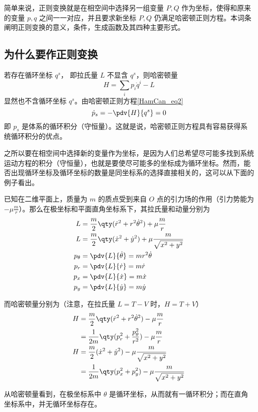 

简单来说，正则变换就是在相空间中选择另一组变量 $P,Q$ 作为坐标，使得和原来的变量 $p,q$ 之间一一对应，并且要求新坐标 $P,Q$ 仍满足哈密顿正则方程。本词条阐明正则变换的意义，条件，生成函数及其四种主要形式。
\subsection{为什么要作正则变换}
若存在循环坐标 $q^s$， 即拉氏量 $L$ 不显含 $q^s$，则哈密顿量
\begin{equation}
H=\sum_i p_i\dot q^i-L
\end{equation}
显然也不含循环坐标 $q^s$。由哈密顿正则方程\autoref{HamCan_eq2}~
\begin{equation}\label{CanTra_eq7}
\dot p_s=-\pdv{H}{q^s}=0
\end{equation}
即 $p_s$ 是体系的循环积分（守恒量）。这就是说，哈密顿正则方程具有容易获得系统循环积分的优点。

之所以要在相空间中选择新的变量作为坐标，是因为人们总希望尽可能多找到系统运动方程的积分（守恒量），也就是要使尽可能多的坐标成为循环坐标。然而，能否出现循环坐标及循环坐标的数量是同坐标系的选择直接相关的，这可以从下面的例子看出。
\begin{example}{}
已知在二维平面上，质量为 $m$ 的质点受到来自 $O$ 点的引力场的作用（引力势能为 $-\mu\frac{m}{r}$）。那么在极坐标和平面直角坐标系下，其拉氏量和动量分别为
\begin{equation}
\begin{aligned}
L&=\frac{m}{2}\qty(\dot r^2+r^2\dot\theta^2)+\mu\frac{m}{r}\\
L&=\frac{m}{2}\qty(\dot x^2+\dot y^2)+\mu\frac{m}{\sqrt{x^2+y^2}}\\
p_\theta&=\pdv{L}{\dot \theta}=mr^2\dot\theta\\
p_r&=\pdv{L}{\dot r}=m\dot r\\
p_x&=\pdv{L}{\dot x}=m\dot x\\
p_y&=\pdv{L}{\dot y}=m\dot y
\end{aligned}
\end{equation}

而哈密顿量分别为（注意，在拉氏量 $L=T-V$ 时，$H=T+V$）
\begin{equation}
\begin{aligned}
H&=\frac{m}{2}\qty(\dot r^2+r^2\dot\theta^2)-\mu\frac{m}{r}\\
&=\frac{1}{2m}\qty(p_r^2+\frac{p_\theta^2}{r^2})-\mu\frac{m}{r}\\
H&=\frac{m}{2}(\dot x^2+\dot y^2)-\mu\frac{m}{\sqrt{x^2+y^2}}\\
&=\frac{1}{2m}\qty(p_x^2+p_y^2)-\mu\frac{m}{\sqrt{x^2+y^2}}
\end{aligned}
\end{equation}

从哈密顿量看到，在极坐标系中 $\theta$ 是循环坐标，从而就有一循环积分；而在直角坐标系中，并无循环坐标存在。 
\end{example}

